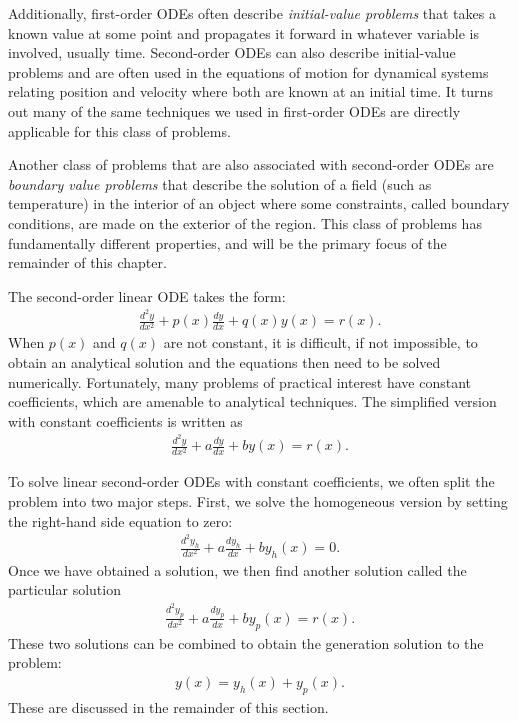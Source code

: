 Additionally, first-order ODEs often describe \emph{initial-value problems} that takes a known value at some point and propagates it forward in whatever variable is involved, usually time. Second-order ODEs can also describe initial-value problems and are often used in the equations of motion for dynamical systems relating position and velocity where both are known at an initial time. It turns out many of the same techniques we used in first-order ODEs are directly applicable for this class of problems.

Another class of problems that are also associated with second-order ODEs are \emph{boundary value problems} that describe the solution of a field (such as temperature) in the interior of an object where some constraints, called boundary conditions, are made on the exterior of the region. This class of problems has fundamentally different properties, and will be the primary focus of the remainder of this chapter.

The second-order linear ODE takes the form:
\begin{align}
  \frac{d^2 y}{dx^2} + p(x) \frac{dy}{dx} + q(x) y(x) = r(x).
\end{align}
When $p(x)$ and $q(x)$ are not constant, it is difficult, if not impossible, to obtain an analytical solution and the equations then need to be solved numerically. Fortunately, many problems of practical interest have constant coefficients, which are amenable to analytical techniques. The simplified version with constant coefficients is written as
\begin{align}
  \frac{d^2 y}{dx^2} + a \frac{dy}{dx} + b y(x) = r(x).
\end{align}

To solve linear second-order ODEs with constant coefficients, we often split the problem into two major steps. First, we solve the homogeneous version by setting the right-hand side equation to zero:
\begin{align}
  \frac{d^2 y_h}{dx^2} + a \frac{dy_h}{dx} + b y_h(x) = 0.
\end{align}
Once we have obtained a solution, we then find another solution called the particular solution 
\begin{align}
  \frac{d^2 y_p}{dx^2} + a \frac{dy_p}{dx} + b y_p(x) = r(x).
\end{align}
These two solutions can be combined to obtain the generation solution to the problem:
\begin{align}
  y(x) = y_h(x) + y_p(x).
\end{align}
These are discussed in the remainder of this section.


